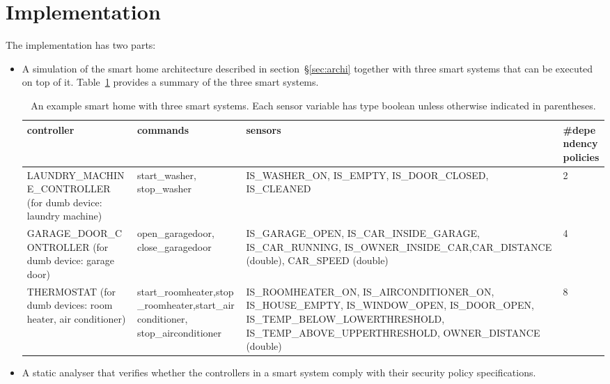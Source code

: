 \documentclass{article}
\begin{document}
\section{Implementation}
\label{sec:impl}
The implementation has two parts: 
\begin{itemize}
\item A simulation of the smart home architecture described in section~\S\ref{sec:archi} together with three smart systems that can be executed on top of it. Table~\ref{table:appliance_sensor} provides a summary of the three smart systems. 
\begin{table}[h]
\begin{center}
\begin{tabular}{|p{4cm}|p{3cm}|p{4.5cm}|p{2cm}|}
\hline
controller & commands & sensors & \#dependency \newline policies \\ \hline
\tiny{LAUNDRY\_MACHINE\_CONTROLLER} \tiny{ (for dumb device: laundry machine)} &
\small start\_washer, \newline \small stop\_washer & 
\tiny{IS\_WASHER\_ON}, \newline \tiny{IS\_EMPTY, \newline IS\_DOOR\_CLOSED, \newline IS\_CLEANED} & 2\\ \hline


\tiny{GARAGE\_DOOR\_CONTROLLER} \tiny{(for dumb device: garage door)} & 
\small{open\_garagedoor, \newline close\_garagedoor}\tiny &  
\tiny{IS\_GARAGE\_OPEN, \newline IS\_CAR\_INSIDE\_GARAGE, \newline IS\_CAR\_RUNNING, \newline IS\_OWNER\_INSIDE\_CAR,\newline CAR\_DISTANCE (double), \newline CAR\_SPEED (double)} & 4\\ \hline

\tiny{THERMOSTAT} \tiny{(for dumb devices: room heater, air conditioner)} & 
\small start\_roomheater,\newline \small stop\_roomheater,\newline\small start\_airconditioner, \newline \small stop\_airconditioner & 
\tiny{IS\_ROOMHEATER\_ON}, \tiny{IS\_AIRCONDITIONER\_ON},
\tiny{IS\_HOUSE\_EMPTY, \newline IS\_WINDOW\_OPEN, \newline IS\_DOOR\_OPEN, IS\_TEMP\_BELOW\_LOWERTHRESHOLD, IS\_TEMP\_ABOVE\_UPPERTHRESHOLD}, \tiny{OWNER\_DISTANCE (double)} & 8\\ \hline
\end{tabular}
\caption{\small{An example smart home with three smart systems. Each sensor variable has type boolean unless otherwise indicated in parentheses.}}
\label{table:appliance_sensor}
\end{center}
\end{table}
\item A static analyser that verifies whether the controllers in a smart system comply with their security policy specifications.
\end{itemize}   
\end{document}
